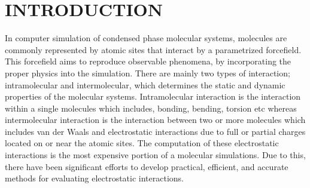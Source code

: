 %
%
%
%
%
%
%
%
%
%
%
%


\chapter{INTRODUCTION}

In computer simulation of condensed phase molecular systems, molecules are commonly represented by atomic sites that interact by a parametrized forcefield. This forcefield aims to reproduce observable phenomena, by incorporating the proper physics into the simulation. There are mainly two types of interaction; intramolecular and intermolecular, which determines the static and dynamic properties of the molecular systems. Intramolecular interaction is the interaction within a single molecules which includes, bonding, bending, torsion etc whereas intermolecular interaction is the interaction between two or more molecules which includes van der Waals and electrostatic interactions due to full or partial charges located on or near the atomic sites. The computation of these electrostatic interactions is the most expensive portion of a molecular simulations. Due to this, there have been significant efforts to develop practical, efficient, and accurate methods for evaluating electrostatic interactions. 

